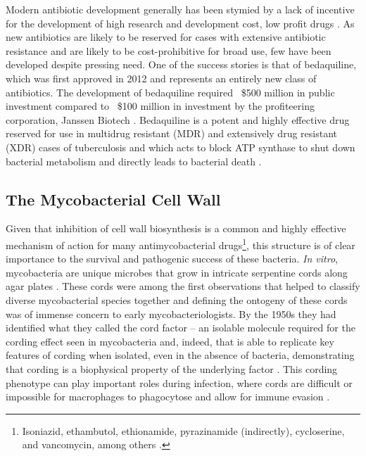 Modern antibiotic development generally has been stymied by a lack of incentive for the development of high research and development cost, low profit drugs \citep{Joshi2011}. As new antibiotics are likely to be reserved for cases with extensive antibiotic resistance and are likely to be cost\hyp{}prohibitive for broad use, few have been developed despite pressing need. One of the success stories is that of bedaquiline, which was first approved in 2012 and represents an entirely new class of antibiotics. The development of bedaquiline required ~\$500 million in public investment compared to ~\$100 million in investment by the profiteering corporation, Janssen Biotech \citep{Gotham2020, Leibert2014, Osborne2013}. Bedaquiline is a potent and highly effective drug reserved for use in multidrug resistant (MDR) and extensively drug resistant (XDR) cases of tuberculosis and which acts to block ATP synthase to shut down bacterial metabolism and directly leads to bacterial death \citep{Nguyen2018, Sarathy2019}. 

\subsection{The Mycobacterial Cell Wall}\label{cellwall}

Given that inhibition of cell wall biosynthesis is a common and highly effective mechanism of action for many antimycobacterial drugs\footnote{Isoniazid, ethambutol, ethionamide, pyrazinamide (indirectly), cycloserine, and vancomycin, among others \citep{Nataraj2015}.}, this structure is of clear importance to the survival and pathogenic success of these bacteria. \textit{In vitro}, mycobacteria are unique microbes that grow in intricate serpentine cords along agar plates \citep{Koch1882, Glickman2000}. These cords were among the first observations that helped to classify diverse mycobacterial species together and defining the ontogeny of these cords was of immense concern to early mycobacteriologists. By the 1950s they had identified what they called the cord factor -- an isolable molecule required for the cording effect seen in mycobacteria and, indeed, that is able to replicate key features of cording when isolated, even in the absence of bacteria, demonstrating that cording is a biophysical property of the underlying factor \citep{Bloch1955, Bloch1953, Sorkin1952, Hunter2006a, Behling1993}. This cording phenotype can play important roles during infection, where cords are difficult or impossible for macrophages to phagocytose and allow for immune evasion \citep{Bernut2014, Ufimtseva2018}. 

